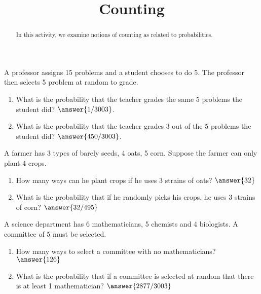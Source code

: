 \documentclass{ximera}
\title{Counting}
\begin{document}
      
\begin{abstract}
      
In this activity, we examine notions of counting as related to probabilities.

      
\end{abstract}
      
\maketitle
 

\begin{problem}
A professor assigns 15 problems and a student chooses to do 5.  The professor then selects 5 problem at random to grade.

\begin{enumerate}
\item What is the probability that the teacher grades the same 5 problems the student did?  $\answer{1/3003}$.
\item What is the probability that the teacher grades 3 out of the  5 problems the student did?  $\answer{450/3003}$.
\end{enumerate}

\end{problem}

\begin{problem}
A farmer has 3 types of barely seeds, 4 oats, 5 corn.  Suppose the farmer can only plant 4 crops.

\begin{enumerate}
\item How many ways can he plant crops if he uses  3 strains of oats? $\answer{32}$
\item What is the probability that if he randomly picks his crops, he uses  3 strains of corn? $\answer{32/495}$
\end{enumerate}


\end{problem}

\begin{problem}
A  science department has 6 mathematicians, 5 chemists and 4 biologists.  A committee of 5 must be selected.

\begin{enumerate}
\item How many ways to select a committee with no mathematicians? $\answer{126}$
\item What is the probability that if a committee is selected at random that there is at least 1 mathematician? $\answer{2877/3003}$
\end{enumerate}


\end{problem}
\end{document}
